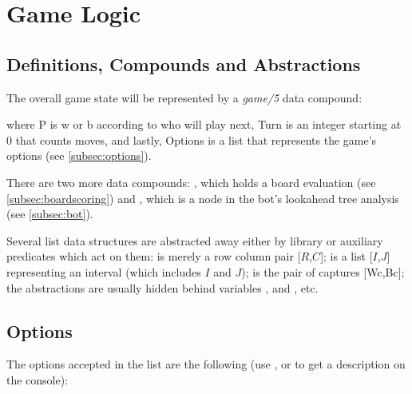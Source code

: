 \documentclass[12pt,a4paper,notitlepage]{article}
\begin{document}
\section{Game Logic}
\label{sec:gamelogic}

\subsection{Definitions, Compounds and Abstractions}
\label{subsec:abstractions}

The overall game state will be represented by a \textit{game/5} data compound:
\begin{center}
\end{center}
where P is w or b according to who will play next, Turn is an integer starting at 0 that counts moves, and lastly, Options is a list that represents the game's options (see \autoref{subsec:options}).

There are two more data compounds: , which holds a board evaluation (see \autoref{subsec:boardscoring}) and , which is a node in the bot's lookahead tree analysis (see \autoref{subsec:bot}).

Several list data structures are abstracted away either by library  or auxiliary predicates which act on them:  is merely a row column pair [$R$,$C$];  is a list [$I$,$J$] representing an interval (which includes $I$ and $J$);  is the pair of captures [Wc,Bc]; the abstractions are usually hidden behind variables ,  and , etc.

\subsection{Options}
\label{subsec:options}

The options accepted in the  list are the following (use ,  or  to get a description on the console):
\end{document}
